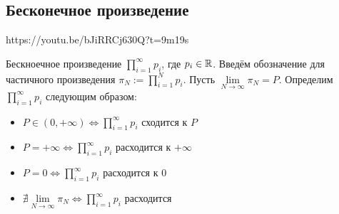 \documentclass[../main.tex]{subfiles}
\begin{document}
\newpage
\subsection{Бесконечное произведение}
https://youtu.be/bJiRRCj630Q?t=9m19s

Бескноечное произведение $\prod\limits_{i=1}^{\infty} p_i$, где $p_i \in \mathbb{R}$.
Введём обозначение для частичного произведения $\pi_N := \prod\limits_{i=1}^{N} p_i$.
Пусть $\lim\limits_{N\to\infty}\pi_N=P$.
Определим $\prod\limits_{i=1}^{\infty} p_i$ следующим образом:
\begin{itemize}
    \item $P \in (0, +\infty) \Leftrightarrow \prod\limits_{i=1}^{\infty} p_i$ сходится к $P$
    \item $P = +\infty \Leftrightarrow \prod\limits_{i=1}^{\infty} p_i$ расходится к $+\infty$
    \item $P = 0 \Leftrightarrow \prod\limits_{i=1}^{\infty} p_i$ расходится к $0$
    \item $\nexists \lim\limits_{N\to\infty}\pi_N \Leftrightarrow \prod\limits_{i=1}^{\infty} p_i$ расходится
\end{itemize}
\end{document}

